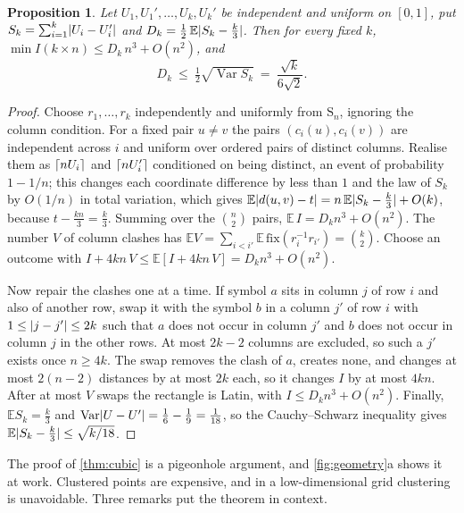 \documentclass[11pt]{article}
\theoremstyle{plain}
\newtheorem{proposition}[theorem]{Proposition}
\theoremstyle{definition}
\theoremstyle{remark}
\newcommand{\Sym}{\mathrm{S}}
\DeclarePairedDelimiter{\abs}{\lvert}{\rvert}
\DeclarePairedDelimiter{\ceil}{\lceil}{\rceil}
\begin{document}
\begin{proposition}\label{prop:random}
Let $U_1,U_1',\dots,U_k,U_k'$ be independent and uniform on $[0,1]$, put
$S_k=\sum_{i=1}^k\abs{U_i-U_i'}$ and $D_k=\frac12\,\mathbb E\abs{S_k-\frac k3}$. Then for every fixed
$k$, $\min I(k\times n)\le D_k\,n^3+O(n^2)$, and
\[
  D_k\ \le\ \tfrac12\sqrt{\operatorname{Var}S_k}\ =\ \frac{\sqrt k}{6\sqrt2}.
\]
\end{proposition}

\begin{proof}
Choose $r_1,\dots,r_k$ independently and uniformly from $\Sym_n$, ignoring the column condition.
For a fixed pair $u\ne v$ the pairs $(c_i(u),c_i(v))$ are independent across $i$ and uniform over
ordered pairs of distinct columns. Realise them as $\ceil{nU_i}$ and $\ceil{nU_i'}$ conditioned on
being distinct, an event of probability $1-1/n$; this changes each coordinate difference by less
than $1$ and the law of $S_k$ by $O(1/n)$ in total variation, which gives $\mathbb E\abs{d(u,v)-t}=n\,\mathbb E\abs{S_k-\frac k3}+O(k)$,
because $t-\frac{kn}3=\frac k3$. Summing over the $\binom n2$ pairs, $\mathbb E\,I=D_kn^3+O(n^2)$.
The number $V$ of column clashes has $\mathbb E V=\sum_{i<i'}\mathbb E\,\mathrm{fix}(r_i^{-1}r_{i'})=\binom k2$.
Choose an outcome with $I+4kn\,V\le\mathbb E[I+4kn\,V]=D_kn^3+O(n^2)$.

Now repair the clashes one at a time. If symbol $a$ sits in column $j$ of row $i$ and also of
another row, swap it with the symbol $b$ in a column $j'$ of row $i$ with $1\le\abs{j-j'}\le2k$
such that $a$ does not occur in column $j'$ and $b$ does not occur in column $j$ in the other rows.
At most $2k-2$ columns are excluded, so such a $j'$ exists once $n\ge4k$. The swap removes the clash
of $a$, creates none, and changes at most $2(n-2)$ distances by at most $2k$ each, so it changes $I$
by at most $4kn$. After at most $V$ swaps the rectangle is Latin, with $I\le D_kn^3+O(n^2)$. Finally,
$\mathbb E S_k=\frac k3$ and $\operatorname{Var}\abs{U-U'}=\frac16-\frac19=\frac1{18}$, so the
Cauchy--Schwarz inequality gives $\mathbb E\abs{S_k-\frac k3}\le\sqrt{k/18}$.
\end{proof}

The proof of \cref{thm:cubic} is a pigeonhole argument, and \cref{fig:geometry}a shows it at work.
Clustered points are expensive, and in a low-dimensional grid clustering is unavoidable. Three
remarks put the theorem in context.
\end{document}
